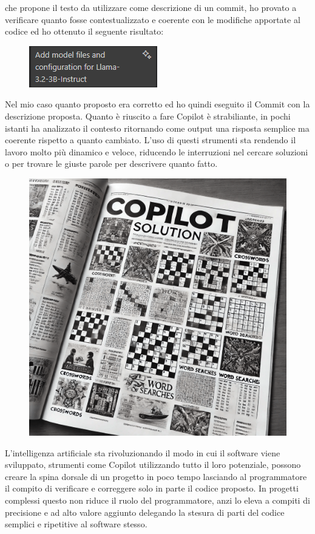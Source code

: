 \documentclass[12pt,a4paper,openright,twoside]{book}
\begin{document}
che propone il testo da utilizzare come descrizione di un commit,
ho provato a verificare quanto fosse contestualizzato e coerente 
con le modifiche apportate al codice ed ho ottenuto il seguente risultato:
\begin{figure}[h]
    \centering
    \includegraphics[width=0.5\linewidth]{figures/commit.png}
    \label{fig:Commit-Autogenerato}
\end{figure}
\newline
Nel mio caso quanto proposto era corretto ed ho quindi eseguito il Commit con la descrizione proposta.
Quanto è riuscito a fare Copilot è strabiliante, in pochi istanti ha analizzato il contesto ritornando come output una risposta semplice ma coerente rispetto a quanto cambiato.
L'uso di questi strumenti sta rendendo il lavoro molto più dinamico e veloce, riducendo le interruzioni nel cercare soluzioni o per trovare le giuste parole per descrivere
quanto fatto.
\begin{figure}[h]
    \centering
    \includegraphics[width=0.5\linewidth]{figures/copilotsolutionSettimanaEnigmistica.png}
    \label{fig:Copilot-Solution}
\end{figure}
\newline
L'intelligenza artificiale sta rivoluzionando il modo in cui il software viene sviluppato, strumenti come Copilot utilizzando tutto il loro potenziale, possono creare la spina dorsale di un progetto
in poco tempo lasciando al programmatore il compito di verificare e correggere solo in parte il codice proposto. 
In progetti complessi questo non riduce il ruolo del programmatore, anzi lo eleva a compiti di precisione e ad alto valore aggiunto delegando la stesura di parti del codice semplici e ripetitive al software stesso.
\end{document}
